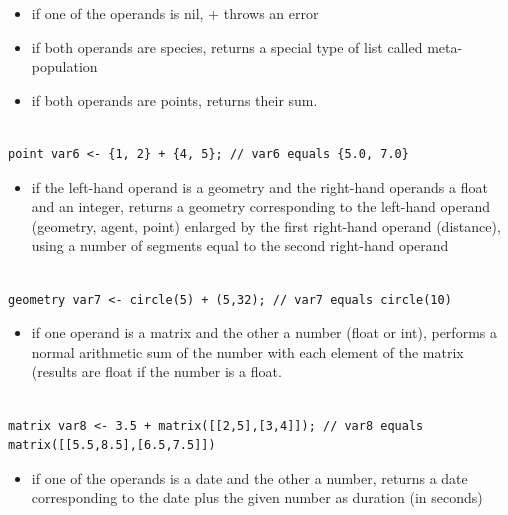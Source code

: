 \documentclass[]{book}
\providecommand{\tightlist}{%
  \setlength{\itemsep}{0pt}\setlength{\parskip}{0pt}}
\theoremstyle{definition}
\theoremstyle{definition}
\theoremstyle{definition}
\theoremstyle{remark}
\begin{document}
\begin{itemize}
\tightlist
\item
  if one of the operands is nil, + throws an error\\
\item
  if both operands are species, returns a special type of list called
  meta-population\\
\item
  if both operands are points, returns their sum.
\end{itemize}

\begin{verbatim}
 
point var6 <- {1, 2} + {4, 5}; // var6 equals {5.0, 7.0}
\end{verbatim}

\begin{itemize}
\tightlist
\item
  if the left-hand operand is a geometry and the right-hand operands a
  float and an integer, returns a geometry corresponding to the
  left-hand operand (geometry, agent, point) enlarged by the first
  right-hand operand (distance), using a number of segments equal to the
  second right-hand operand
\end{itemize}

\begin{verbatim}
 
geometry var7 <- circle(5) + (5,32); // var7 equals circle(10)
\end{verbatim}

\begin{itemize}
\tightlist
\item
  if one operand is a matrix and the other a number (float or int),
  performs a normal arithmetic sum of the number with each element of
  the matrix (results are float if the number is a float.
\end{itemize}

\begin{verbatim}
 
matrix var8 <- 3.5 + matrix([[2,5],[3,4]]); // var8 equals matrix([[5.5,8.5],[6.5,7.5]])
\end{verbatim}

\begin{itemize}
\tightlist
\item
  if one of the operands is a date and the other a number, returns a
  date corresponding to the date plus the given number as duration (in
  seconds)
\end{itemize}
\end{document}
